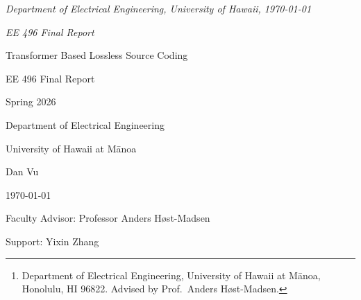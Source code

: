 \documentclass[onecolumn,english,12pt]{IEEEtran}
\theoremstyle{plain}
\theoremstyle{plain}
\theoremstyle{plain}
\theoremstyle{definition}
\begin{document}
\begin{titlepage}
  \normalfont

  \textit{Department of Electrical Engineering, University of Hawaii, \today}

  \vspace{0.5em}
  \textit{EE 496 Final Report}

  \vspace{4cm}

  {\Huge Transformer Based Lossless Source Coding}

  \vspace{3cm}

  {\large EE 496 Final Report}

  {\large Spring 2026}

  \vspace{1.5em}

  {\large Department of Electrical Engineering}

  {\large University of Hawaii at M\={a}noa}

  \vspace{2cm}

  {\Large Dan Vu}

  \vspace{3cm}

  \today

  \vfill

  {\large Faculty Advisor: Professor Anders H\o{}st-Madsen}

  {\large Support: Yixin Zhang}

\end{titlepage}


\author{Dan Vu%
  \thanks{Department of Electrical Engineering,
          University of Hawaii at M\={a}noa, Honolulu, HI 96822.
          Advised by Prof.\ Anders H\o{}st-Madsen.}}
\end{document}
